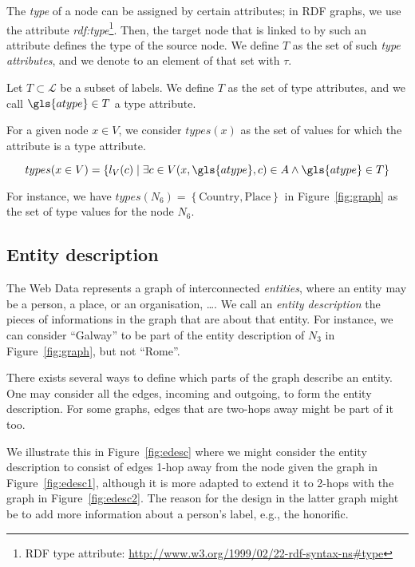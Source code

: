 The \emph{type} of a node can be assigned by certain attributes; in RDF graphs, we use the attribute \emph{rdf:type}\footnote{RDF type attribute: \url{http://www.w3.org/1999/02/22-rdf-syntax-ns\#type}}. Then, the target node that is linked to by such an attribute defines the type of the source node. We define $T$ as the set of such \emph{type attributes}, and we denote to an element of that set with $\tau$.%

\begin{definition}
Let $T \subset \mathcal{L}$ be a subset of labels.
We define $T$ as the set of type attributes, and we call $\gls{atype} \in T$ a type attribute.
\end{definition}

For a given node $x \in V$, we consider $types(x)$ as the set of values for which the attribute is a type attribute.

$$
types(x\in V) = \left\lbrace l_V(c) \mid \exists c \in V (x, \gls{atype}, c) \in A \wedge \gls{atype} \in T \right\rbrace
$$

For instance, we have $types\left(N_6\right) = \left\{ \text{Country}, \text{Place} \right\}$ in Figure~\ref{fig:graph} as the set of type values for the node $N_6$.

\subsection{Entity description}
\label{sec:entity-description}

The Web Data represents a graph of interconnected \emph{entities}, where an entity may be a person, a place, or an organisation, \ldots. We call an \emph{entity description} the pieces of informations in the graph that are about that entity. For instance, we can consider ``Galway'' to be part of the entity description of $N_3$ in Figure~\ref{fig:graph}, but not ``Rome''.

There exists several ways to define which parts of the graph describe an entity. One may consider all the edges, incoming and outgoing, to form the entity description. For some graphs, edges that are two-hops away might be part of it too.

We illustrate this in Figure~\ref{fig:edesc} where we might consider the entity description to consist of edges 1-hop away from the node given the graph in Figure~\ref{fig:edesc1}, although it is more adapted to extend it to 2-hops with the graph in Figure~\ref{fig:edesc2}. The reason for the design in the latter graph might be to add more information about a person's label, e.g., the honorific.

